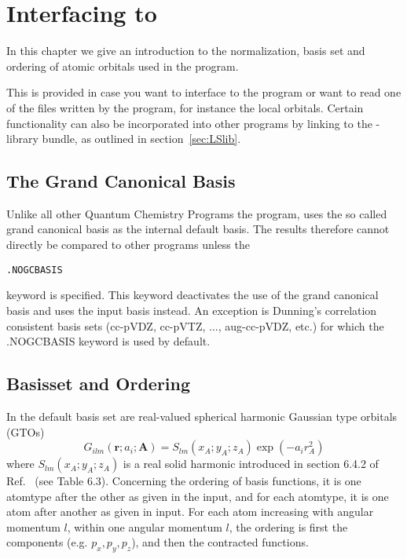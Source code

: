 \chapter{Interfacing to {\lsdalton}}\label{interfacing}

In this chapter we give an introduction to the normalization, basis set and ordering of atomic orbitals used in the {\lsdalton} program. 

This is provided in case you want to interface to the {\lsdalton} program or want to read one of the files written by the {\lsdalton} program, for instance 
the local orbitals.
Certain functionality can also be incorporated into other programs by linking to the
{\lsdalton}-library bundle, as outlined in section~\ref{sec:LSlib}.

\section{The Grand Canonical Basis}

Unlike all other Quantum Chemistry Programs the {\lsdalton} program, uses the so called grand canonical basis \cite{trilevel1,trilevel2} as the internal default basis. 
The results therefore cannot directly be compared to other programs unless the 
\begin{verbatim}
.NOGCBASIS
\end{verbatim}
keyword is specified. This keyword deactivates the use of the grand canonical basis and uses the input basis instead. 
An exception is Dunning's correlation consistent basis sets (cc-pVDZ, cc-pVTZ, ..., aug-cc-pVDZ, etc.) for which the .NOGCBASIS keyword is used by default.

\section{Basisset and Ordering}

In {\lsdalton} the default basis set are real-valued spherical harmonic Gaussian type
orbitals (GTOs)
\begin{equation}
G_{ilm}(\textbf{r}; a_{i};\textbf{A}) = S_{lm}(x_{A}; y_{A}; z_{A}) \exp(-a_{i}r^{2}_{A})
\end{equation}
where $S_{lm}(x_{A}; y_{A}; z_{A})$ is a real solid harmonic introduced in section 6.4.2 of Ref.~\cite{MEST} (see Table 6.3).
Concerning the ordering of basis functions, it is one atomtype after the other as given
in the input, and for each atomtype, it is one atom after another as given in input. For
each atom increasing with angular momentum $l$, within one angular momentum $l$, the ordering 
is first the components (e.g. $p_{x},p_{y},p_{z}$), and then the contracted functions.



